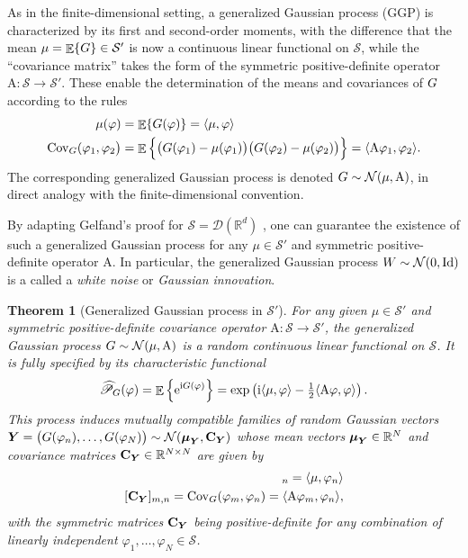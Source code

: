 \documentclass[11pt, english,english]{article}
\newtheorem{theorem}{Theorem}
\newcommand{\R}{ \mathbb{R}}
\def\V#1{{\boldsymbol{#1}}}         %
\def\Spc#1{{\mathcal{#1}}}  %
\def\M#1{{\bf{#1}}}  %
\def\Op#1{{\mathrm{#1}}}  %
\def\ee{\mathrm{e}}
\def\jj{\mathrm{i}}
\def\Prob{\mathscr{P}}
\def\Form{\widehat{\Prob}}
\def\Exp{\mathop{\mathbb{E}}\nolimits}
\def\Identity{\mathrm{Id}} %
\renewcommand{\[}{\begin{equation}}
\renewcommand{\]}[1]{\label{eq:#1}\end{equation}}
\def\Prob{\mathscr{P}}
\def\Form{\widehat{\Prob}}
\def\Exp{\mathop{\mathbb{E}}\nolimits}
\def\VRand#1{{\uppercase{\boldsymbol #1}}}         %
\def\gRand#1{{\uppercase{ #1}}}         %
\begin{document}
As in the finite-dimensional setting, a generalized Gaussian process (GGP) is characterized by its first and second-order moments, with the difference that the mean $\mu=\Exp\{ \gRand g\}\in \Spc S'$
is now a continuous linear functional on $\Spc S$, while the ``covariance matrix'' takes the form of the symmetric positive-definite operator $\Op A: \Spc S \to \Spc S'$. These enable the determination
of the means and covariances of $\gRand g$ according to the rules
\begin{align*}
\mu(\varphi)&=\Exp\{\gRand g(\varphi)\}=\langle \mu,\varphi\rangle \\
{\rm Cov}_{\gRand G}(\varphi_1,\varphi_2\big)&=\Exp\Big\{\big(\gRand g(\varphi_1)-\mu(\varphi_1)\big)\big(\gRand g(\varphi_2)-\mu(\varphi_2)\big)\Big\}=\langle \Op A \varphi_1,\varphi_2 \rangle.
\end{align*}
The corresponding generalized Gaussian process is denoted $\gRand g \sim \Spc N(\mu,\Op A)$, in direct analogy with the finite-dimensional convention. 

By adapting Gelfand's proof for $\Spc S=\Spc D(\R^d)$ \cite{Gelfand-Villenkin1964}, one can guarantee the existence of such a generalized Gaussian process for any $\mu \in \Spc S'$ and symmetric positive-definite operator $\Op A$. In particular, the generalized Gaussian process $\gRand W \sim \Spc N(0,\Identity)$ is a called a {\em white noise} or {\em Gaussian innovation}.
\begin{theorem}[Generalized Gaussian process in $\Spc S'$]
\label{Theo:GGaussProcess}
For any given $\mu \in \Spc S'$ and
symmetric positive-definite covariance operator $\Op A: \Spc S \to \Spc S'$,
the generalized Gaussian process $\gRand g \sim \Spc N(\mu,\Op A)$ is a random continuous linear functional on $\Spc S$. It is fully specified by its characteristic functional
\begin{align}
\label{Eq:CharacGauss}
\Form_{\gRand g}(\varphi)=
\Exp\Big\{\ee^{ \jj \gRand g(\varphi)}\Big\} = \exp\left( \jj \langle \mu,\varphi\rangle - \tfrac{1}{2} \langle \Op A \varphi, \varphi\rangle \right).
\end{align}
This process induces mutually compatible families of random Gaussian vectors $\VRand Y={\big(\gRand g(\varphi_n), \dots,\gRand g(\varphi_N)\big)} \sim \Spc N(\V \mu_{\VRand Y},\M C_{\VRand Y})$ whose mean vectors $\V \mu_{\VRand Y}\in \R^N$ and covariance matrices $\M C_{\VRand Y} \in \R^{N \times N}$ are given by
\begin{align}
[\V \mu_{\VRand Y}]_n=\langle \mu,\varphi_n\rangle\\
[\M C_{\VRand Y}]_{m,n}={\rm Cov}_{\gRand g}(\varphi_m,\varphi_n)=\langle \Op A \varphi_m,\varphi_n \rangle,
\end{align}
with the symmetric matrices $\M C_{\VRand Y}$ being positive-definite for any combination of linearly independent $\varphi_1,\dots,\varphi_N \in \Spc S$.
\end{theorem}
\end{document}
